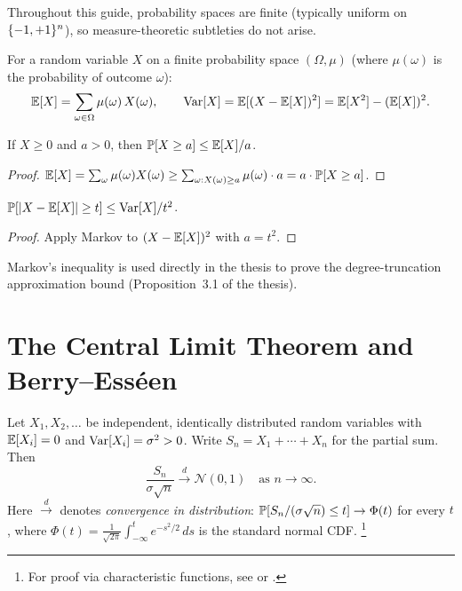 Throughout this guide, probability spaces are finite (typically uniform
on $\{-1,+1\}^n$), so measure-theoretic subtleties do not arise.

\begin{definition}\label{def:expectation}
For a random variable $X$ on a finite probability space
$(\Omega, \mu)$ (where $\mu(\omega)$ is the probability of outcome $\omega$):
\[
  \mathbb{E}[X] = \sum_{\omega \in \Omega} \mu(\omega)\, X(\omega),
  \qquad
  \operatorname{Var}[X] = \mathbb{E}[(X - \mathbb{E}[X])^2] = \mathbb{E}[X^2] - (\mathbb{E}[X])^2.
\]
\end{definition}

\begin{theorem}\label{thm:markov}
If $X \geq 0$ and $a > 0$, then $\mathbb{P}[X \geq a] \leq \mathbb{E}[X] / a$.
\end{theorem}

\begin{proof}
$\mathbb{E}[X] = \sum_\omega \mu(\omega) X(\omega) \geq \sum_{\omega : X(\omega) \geq a} \mu(\omega) \cdot a = a \cdot \mathbb{P}[X \geq a]$.
\end{proof}

\begin{corollary}\label{cor:chebyshev}
$\mathbb{P}[|X - \mathbb{E}[X]| \geq t] \leq \operatorname{Var}[X] / t^2$.
\end{corollary}

\begin{proof}
Apply Markov to $(X - \mathbb{E}[X])^2$ with $a = t^2$.
\end{proof}

Markov's inequality is used directly in the thesis to prove the
degree-truncation approximation bound (Proposition~3.1 of the thesis).


\section{The Central Limit Theorem and Berry--Ess\'een}\label{sec:clt}

\begin{theorem}\label{thm:clt}
Let $X_1, X_2, \ldots$ be independent, identically distributed random
variables with $\mathbb{E}[X_i] = 0$ and $\operatorname{Var}[X_i] = \sigma^2 > 0$. Write
$S_n = X_1 + \cdots + X_n$ for the partial sum. Then
\[
  \frac{S_n}{\sigma\sqrt{n}}
  \xrightarrow{d} \mathcal{N}(0, 1)
  \quad \text{as } n \to \infty.
\]
Here $\xrightarrow{d}$ denotes \emph{convergence in distribution}:
$\mathbb{P}[S_n / (\sigma\sqrt{n}) \leq t] \to \Phi(t)$ for every $t$,
where $\Phi(t) = \frac{1}{\sqrt{2\pi}}\int_{-\infty}^t e^{-s^2/2}\,ds$
is the standard normal CDF.%
\footnote{For proof via characteristic functions, see
\citet[Chapter~3]{durrett2019probability} or
\citet[Chapter~XV]{feller1971introduction}.}
\end{theorem}

